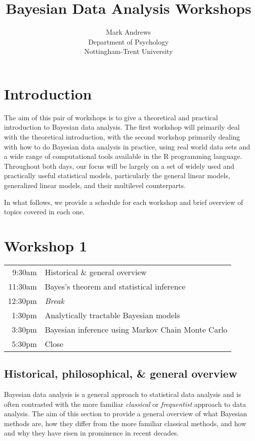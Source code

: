 \documentclass{mjandrews.notes.nomp}
\title{Bayesian Data Analysis Workshops}
\author{Mark Andrews \\ Department of Psychology \\ Nottingham-Trent University}
\date{}
\begin{document}
\maketitle

\section{Introduction}

The aim of this pair of workshops is to give a theoretical and practical
introduction to Bayesian data analysis. The first workshop will primarily deal
with the theoretical introduction, with the second workshop primarily dealing
with how to do Bayesian data analysis in practice, using real world data sets
and a wide range of computational tools available in the R programming
language.  Throughout both days, our focus will be largely on a set of widely
used and practically useful statistical models, particularly the general linear
models, generalized linear models, and their multilevel counterparts. 

In what follows, we provide a schedule for each workshop and brief overview of
topics covered in each one.

\section{Workshop 1}

\begin{center}
	\begin{tabular}{rp{}}
		9:30am & Historical \& general overview \\
		11:30am & Bayes's theorem and statistical inference\\
		12:30pm & \emph{Break} \\
		1:30pm & Analytically tractable Bayesian models \\
		3:30pm & Bayesian inference using Markov Chain Monte Carlo \\
		5:30pm & Close  \\
\end{tabular}
\end{center}


\subsection*{Historical, philosophical, \& general overview}

Bayesian data analysis is a general approach to statistical data analysis and
is often contrasted with the more familiar \emph{classical} or
\emph{frequentist} approach to data analysis.   The aim of this section to
provide a general overview of what Bayesian methods are, how they differ from
the more familiar classical methods, and how and why they have risen in
prominence in recent decades.
\end{document}
